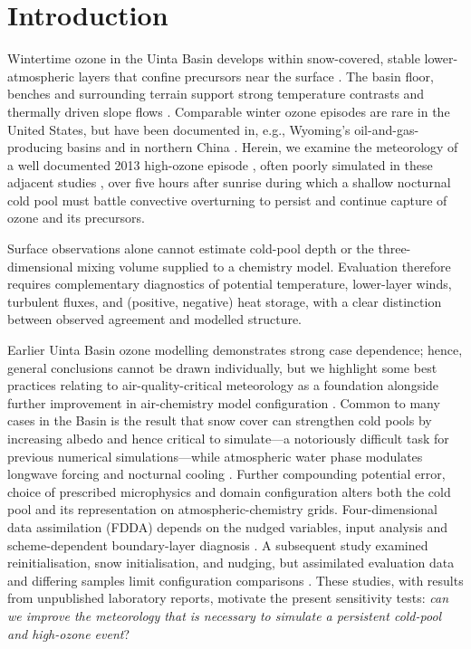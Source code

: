 \documentclass[air,article,submit,moreauthors]{Definitions/mdpi}
\begin{document}
\section{Introduction}
\label{sec:v3-introduction}

Wintertime ozone in the Uinta Basin develops within snow-covered, stable lower-atmospheric layers that confine precursors near the surface \citep{Ahmadov2015-zm,Neemann2015-ws,Davies2025-wy}.
The basin floor, benches and surrounding terrain support strong temperature contrasts and thermally driven slope flows \citep{Lyman2015-aq,Whiteman2000}.
Comparable winter ozone episodes are rare in the United States, but have been documented in, e.g., Wyoming's oil-and-gas-producing basins \citep{Schnell2009-pe,Oltmans2014-md} and in northern China \citep{Li2021-xk}.
Herein, we examine the meteorology of a well documented 2013 high-ozone episode \citep{Mansfield2020-kl}, often poorly simulated in these adjacent studies \citep{Neemann2015-ws,Lyman2015-aq,Matichuk2017-bq,Tran2018-cx}, over five hours after sunrise during which a shallow nocturnal cold pool must battle convective overturning to persist and continue capture of ozone and its precursors. 

Surface observations alone cannot estimate cold-pool depth or the three-dimensional mixing volume supplied to a chemistry model.
Evaluation therefore requires complementary diagnostics of potential temperature, lower-layer winds, turbulent fluxes, and (positive, negative) heat storage, with a clear distinction between observed agreement and modelled structure.

Earlier Uinta Basin ozone modelling demonstrates strong case dependence; hence, general conclusions cannot be drawn individually, but we highlight some best practices relating to air-quality-critical meteorology as a foundation alongside further improvement in air-chemistry model configuration \citep{Stajner2022-uw,Huang2025-kv,Ivey2019-wn}.
Common to many cases in the Basin \citep{Neemann2015-ws,Mansfield2024-lc} is the result that snow cover can strengthen cold pools by increasing albedo and hence critical to simulate---a notoriously difficult task for previous numerical simulations---while atmospheric water phase modulates longwave forcing and nocturnal cooling \citep{Neemann2015-ws,Hallar2021-yt}.
Further compounding potential error, choice of prescribed microphysics and domain configuration alters both the cold pool and its representation on atmospheric-chemistry grids.
Four-dimensional data assimilation (FDDA) depends on the nudged variables, input analysis and scheme-dependent boundary-layer diagnosis \citep{Tran2018FDDA}.
A subsequent study examined reinitialisation, snow initialisation, and nudging, but assimilated evaluation data and differing samples limit configuration comparisons \citep{Tran2021-al}.
These studies, with results from unpublished laboratory reports, motivate the present sensitivity tests: \textit{can we improve the meteorology that is necessary to simulate a persistent cold-pool and high-ozone event}?
\end{document}

